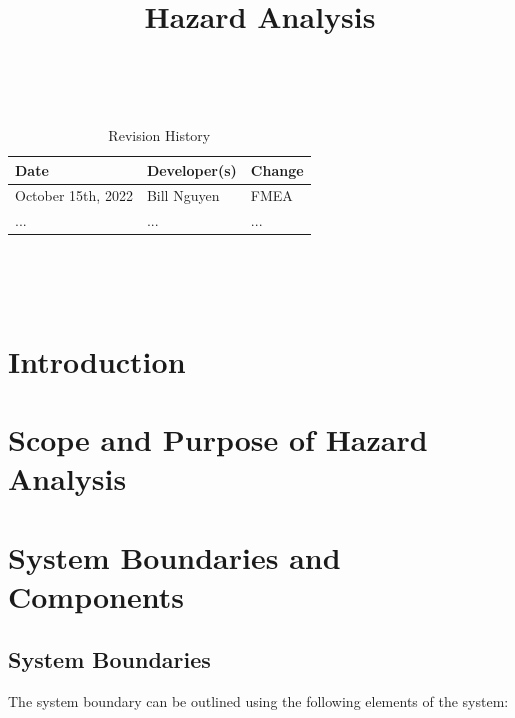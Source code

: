 \documentclass{article}
\title{Hazard Analysis\\\progname}
\author{\authname}
\date{}
\begin{document}
\maketitle
\thispagestyle{empty}

~\newpage


\begin{table}[hp]
\caption{Revision History} \label{TblRevisionHistory}
\begin{tabularx}{\textwidth}{llX}
\toprule
\textbf{Date} & \textbf{Developer(s)} & \textbf{Change}\\
\midrule
October 15th, 2022 & Bill Nguyen & FMEA \\
... & ... & ...\\
\bottomrule
\end{tabularx}
\end{table}

~\newpage

\tableofcontents

~\newpage



\section{Introduction}


\section{Scope and Purpose of Hazard Analysis}

\section{System Boundaries and Components}

\subsection{System Boundaries}
\noindent The system boundary can be outlined using the following elements of the system: 
\end{document}
